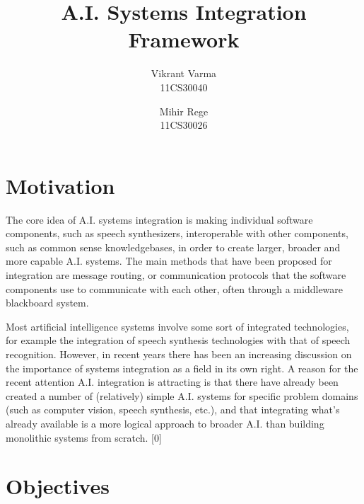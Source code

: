 \documentclass[14pt]{article} %
\title{A.I. Systems Integration Framework}
\author{
	Vikrant Varma\\
	11CS30040
 \and 
	Mihir Rege\\
	11CS30026
}
\begin{document}
\maketitle

\section{Motivation}

The core idea of A.I. systems integration is making individual software components, such as speech synthesizers, interoperable with other components, such as common sense knowledgebases, in order to create larger, broader and more capable A.I. systems. The main methods that have been proposed for integration are message routing, or communication protocols that the software components use to communicate with each other, often through a middleware blackboard system.

Most artificial intelligence systems involve some sort of integrated technologies, for example the integration of speech synthesis technologies with that of speech recognition. However, in recent years there has been an increasing discussion on the importance of systems integration as a field in its own right. A reason for the recent attention A.I. integration is attracting is that there have already been created a number of (relatively) simple A.I. systems for specific problem domains (such as computer vision, speech synthesis, etc.), and that integrating what's already available is a more logical approach to broader A.I. than building monolithic systems from scratch. [0]

\section{Objectives}
\end{document}
